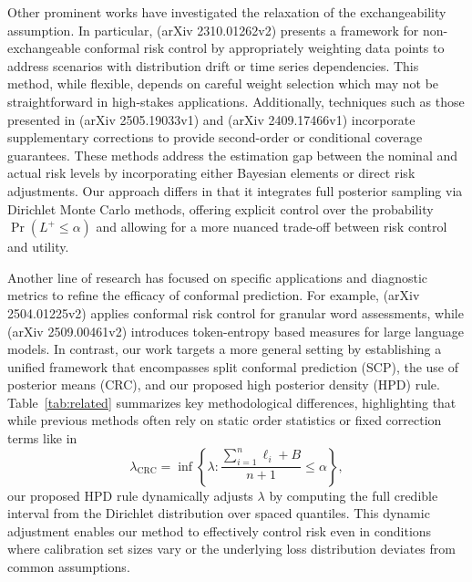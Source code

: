 \documentclass{article}
\begin{document}
Other prominent works have investigated the relaxation of the exchangeability assumption. In particular, (arXiv 2310.01262v2) presents a framework for non-exchangeable conformal risk control by appropriately weighting data points to address scenarios with distribution drift or time series dependencies. This method, while flexible, depends on careful weight selection which may not be straightforward in high-stakes applications. Additionally, techniques such as those presented in (arXiv 2505.19033v1) and (arXiv 2409.17466v1) incorporate supplementary corrections to provide second-order or conditional coverage guarantees. These methods address the estimation gap between the nominal and actual risk levels by incorporating either Bayesian elements or direct risk adjustments. Our approach differs in that it integrates full posterior sampling via Dirichlet Monte Carlo methods, offering explicit control over the probability $\Pr(L^+ \leq \alpha)$ and allowing for a more nuanced trade-off between risk control and utility.

Another line of research has focused on specific applications and diagnostic metrics to refine the efficacy of conformal prediction. For example, (arXiv 2504.01225v2) applies conformal risk control for granular word assessments, while (arXiv 2509.00461v2) introduces token-entropy based measures for large language models. In contrast, our work targets a more general setting by establishing a unified framework that encompasses split conformal prediction (SCP), the use of posterior means (CRC), and our proposed high posterior density (HPD) rule. Table~\ref{tab:related} summarizes key methodological differences, highlighting that while previous methods often rely on static order statistics or fixed correction terms like in
\[
\lambda_{\text{CRC}} = \inf\left\{\lambda : \frac{\sum_{i=1}^n \ell_i + B}{n+1} \leq \alpha\right\},
\]
our proposed HPD rule dynamically adjusts $\lambda$ by computing the full credible interval from the Dirichlet distribution over spaced quantiles. This dynamic adjustment enables our method to effectively control risk even in conditions where calibration set sizes vary or the underlying loss distribution deviates from common assumptions.
\end{document}
